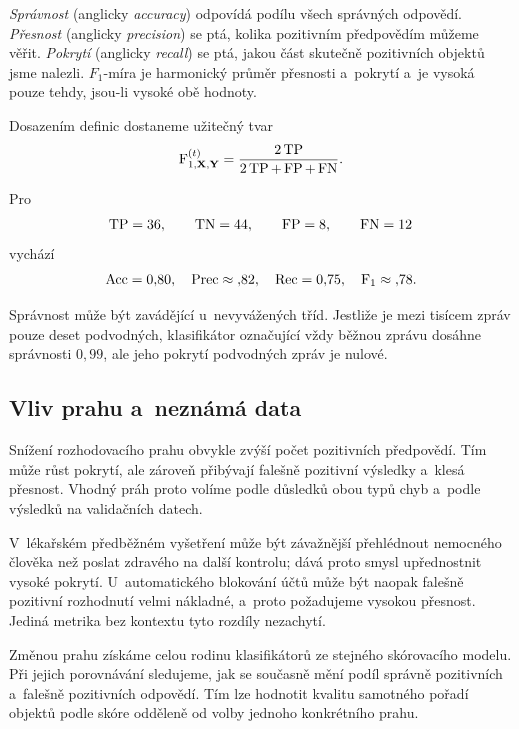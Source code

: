 \emph{Správnost} (anglicky \emph{accuracy}) odpovídá podílu všech správných odpovědí. \emph{Přesnost} (anglicky \emph{precision}) se ptá, kolika pozitivním předpovědím můžeme věřit. \emph{Pokrytí} (anglicky \emph{recall}) se ptá, jakou část skutečně pozitivních objektů jsme nalezli. \(F_1\)-míra je harmonický průměr přesnosti a~pokrytí a~je vysoká pouze tehdy, jsou-li vysoké obě hodnoty.

Dosazením definic dostaneme užitečný tvar
\[
    \operatorname{F}_{1,\mathbf{X},\mathbf{Y}}^{(t)}
    =
    \frac{2\operatorname{TP}}{2\operatorname{TP}+\operatorname{FP}+\operatorname{FN}}.
\]

\begin{example}
    Pro
    \[
        \operatorname{TP}=36,\qquad
        \operatorname{TN}=44,\qquad
        \operatorname{FP}=8,\qquad
        \operatorname{FN}=12
    \]
    vychází
    \[
        \operatorname{Acc}=0{,}80,
        \quad
        \operatorname{Prec}\approx{,}82,
        \quad
        \operatorname{Rec}=0{,}75,
        \quad
        \operatorname{F}_1\approx{,}78.
    \]
\end{example}

Správnost může být zavádějící u~nevyvážených tříd. Jestliže je mezi tisícem zpráv pouze deset podvodných, klasifikátor označující vždy běžnou zprávu dosáhne správnosti \(0{,}99\), ale jeho pokrytí podvodných zpráv je nulové.

\subsection{Vliv prahu a~neznámá data}

Snížení rozhodovacího prahu obvykle zvýší počet pozitivních předpovědí. Tím může růst pokrytí, ale zároveň přibývají falešně pozitivní výsledky a~klesá přesnost. Vhodný práh proto volíme podle důsledků obou typů chyb a~podle výsledků na validačních datech.

V~lékařském předběžném vyšetření může být závažnější přehlédnout nemocného člověka než poslat zdravého na další kontrolu; dává proto smysl upřednostnit vysoké pokrytí. U~automatického blokování účtů může být naopak falešně pozitivní rozhodnutí velmi nákladné, a~proto požadujeme vysokou přesnost. Jediná metrika bez kontextu tyto rozdíly nezachytí.

Změnou prahu získáme celou rodinu klasifikátorů ze stejného skórovacího modelu. Při jejich porovnávání sledujeme, jak se současně mění podíl správně pozitivních a~falešně pozitivních odpovědí. Tím lze hodnotit kvalitu samotného pořadí objektů podle skóre odděleně od volby jednoho konkrétního prahu.

